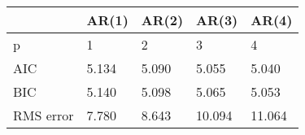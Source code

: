 \begin{tabular}{lllll}
\toprule
{} &  AR(1) &  AR(2) &   AR(3) &   AR(4) \\
\midrule
p  &      1 &      2 &       3 &       4 \\
AIC       &  5.134 &  5.090 &   5.055 &   5.040 \\
BIC       &  5.140 &  5.098 &   5.065 &   5.053 \\
RMS error &  7.780 &  8.643 &  10.094 &  11.064 \\
\bottomrule
\end{tabular}
